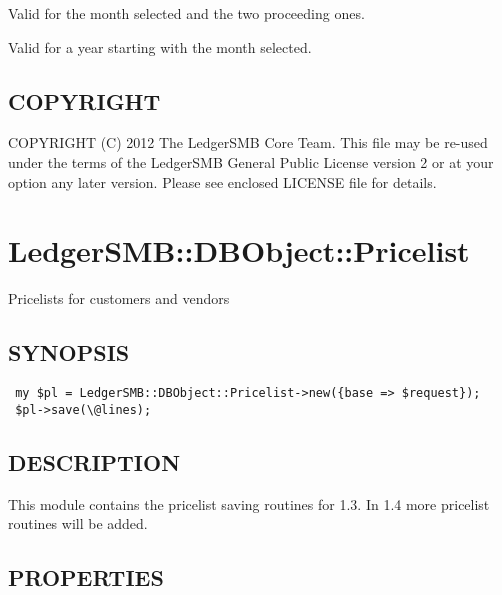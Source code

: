 \begin{description}
\begin{description}
\begin{description}
\begin{description}
\begin{description}
\begin{description}
\begin{description}
\begin{description}
\begin{description}
\begin{description}
\begin{description}
\begin{description}
Valid for the month selected and the two proceeding ones.


\item[{year}] \mbox{}

Valid for a year starting with the month selected.

\end{description}
\end{description}
\subsection*{COPYRIGHT\label{LedgerSMB::DBObject::Report_COPYRIGHT}}


COPYRIGHT (C) 2012 The LedgerSMB Core Team.  This file may be re-used under the
terms of the LedgerSMB General Public License version 2 or at your option any
later version.  Please see enclosed LICENSE file for details.

\section{LedgerSMB::DBObject::Pricelist\label{LedgerSMB::DBObject::Pricelist}}


Pricelists for customers and vendors

\subsection*{SYNOPSIS\label{LedgerSMB::DBObject::Pricelist_SYNOPSIS}}
\begin{verbatim}
 my $pl = LedgerSMB::DBObject::Pricelist->new({base => $request});
 $pl->save(\@lines);
\end{verbatim}
\subsection*{DESCRIPTION\label{LedgerSMB::DBObject::Pricelist_DESCRIPTION}}


This module contains the pricelist saving routines for 1.3.  In 1.4 more
pricelist routines will be added.

\subsection*{PROPERTIES\label{LedgerSMB::DBObject::Pricelist_PROPERTIES}}
\begin{description}


\end{description}
\end{description}
\end{description}
\end{description}
\end{description}
\end{description}
\end{description}
\end{description}
\end{description}
\end{description}
\end{description}
